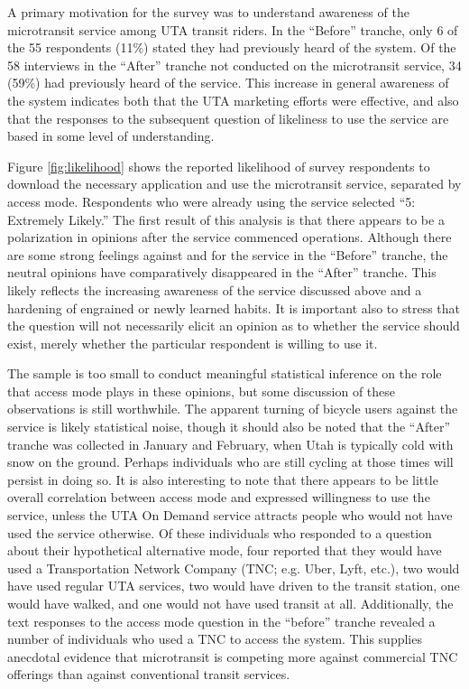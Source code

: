 \documentclass[smartcities,article,submit,moreauthors,pdftex]{Definitions/mdpi}
\begin{document}
A primary motivation for the survey was to understand awareness of the microtransit service among UTA transit riders. In the “Before” tranche, only 6 of the 55 respondents (11\%) stated they had previously heard of the system. Of the 58 interviews in the “After” tranche not conducted on the microtransit service, 34 (59\%) had previously heard of the service. This increase in general awareness of the system indicates both that the UTA marketing efforts were effective, and also that the responses to the subsequent question of likeliness to use the service are based in some level of understanding.

Figure \ref{fig:likelihood} shows the reported likelihood of survey respondents to download the necessary application and use the microtransit service, separated by access mode. Respondents who were already using the service selected “5: Extremely Likely.” The first result of this analysis is that there appears to be a polarization in opinions after the service commenced operations. Although there are some strong feelings against and for the service in the “Before” tranche, the neutral opinions have comparatively disappeared in the “After” tranche. This likely reflects the increasing awareness of the service discussed above and a hardening of engrained or newly learned habits. It is important also to stress that the question will not necessarily elicit an opinion as to whether the service should exist, merely whether the particular respondent is willing to use it.

The sample is too small to conduct meaningful statistical inference on the role that access mode plays in these opinions, but some discussion of these observations is still worthwhile. The apparent turning of bicycle users against the service is likely statistical noise, though it should also be noted that the “After” tranche was collected in January and February, when Utah is typically cold with snow on the ground. Perhaps individuals who are still cycling at those times will persist in doing so. It is also interesting to note that there appears to be little overall correlation between access mode and expressed willingness to use the service, unless the UTA On Demand service attracts people who would not have used the service otherwise. Of these individuals who responded to a question about their hypothetical alternative mode, four reported that they would have used a Transportation Network Company (TNC; e.g. Uber, Lyft, etc.), two would have used regular UTA services, two would have driven to the transit station, one would have walked, and one would not have used transit at all. Additionally, the text responses to the access mode question in the “before” tranche revealed a number of individuals who used a TNC to access the system. This supplies anecdotal evidence that microtransit is competing more against commercial TNC offerings than against conventional transit services.
\end{document}
